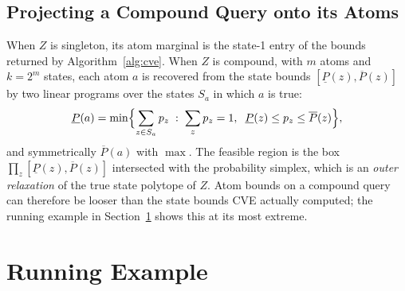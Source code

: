 \documentclass[11pt]{article}
\theoremstyle{definition}
\begin{document}
\subsection{Projecting a Compound Query onto its Atoms}
\label{sec:projection}

When $Z$ is singleton, its atom marginal is the state-1 entry of the bounds
returned by Algorithm~\ref{alg:cve}. When $Z$ is compound, with $m$ atoms and
$k = 2^m$ states, each atom $a$ is recovered from the state bounds
$[\underline{P}(z), \overline{P}(z)]$ by two linear programs over the states
$S_a$ in which $a$ is true:
\[
  \underline{P}(a) = \min \Bigl\{ \sum_{z \in S_a} p_z \;:\;
    \sum_{z} p_z = 1, \;\;
    \underline{P}(z) \le p_z \le \overline{P}(z) \Bigr\},
\]
and symmetrically $\overline{P}(a)$ with $\max$. The feasible region is the box
$\prod_z [\underline{P}(z), \overline{P}(z)]$ intersected with the probability
simplex, which is an \emph{outer relaxation} of the true state polytope of $Z$.
Atom bounds on a compound query can therefore be looser than the state bounds
CVE actually computed; the running example in Section~\ref{sec:example} shows
this at its most extreme.

\section{Running Example}
\label{sec:example}
\end{document}
